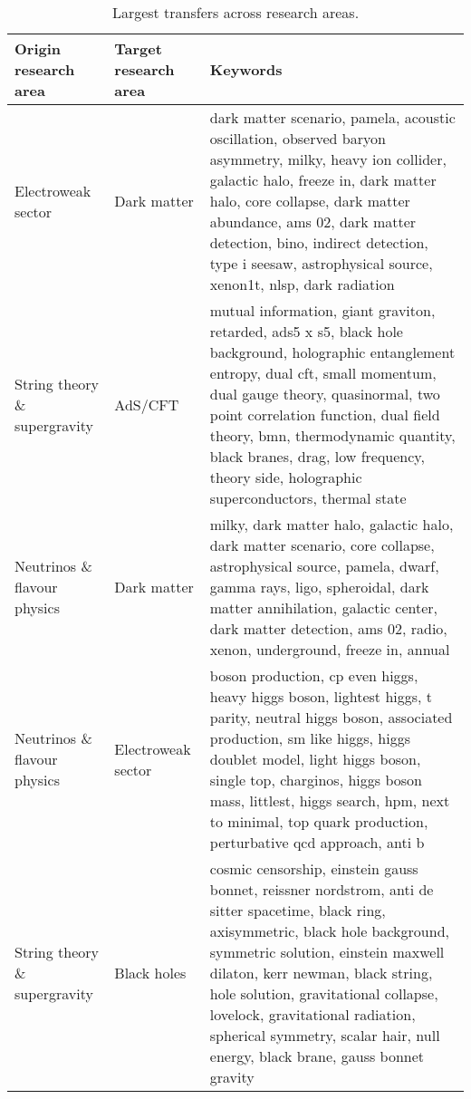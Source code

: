 \begin{table}
\centering
\caption{Largest transfers across research areas.}
\label{table:largest_transfers}
\begin{tabular}{b{}|b{}|b{}}
\toprule
         Origin research area & Target research area &                                                                                                                                                                                                                                                                                                                                                                    Keywords \\ \hline
\midrule
           Electroweak sector &          Dark matter &                                                     dark matter scenario, pamela, acoustic oscillation, observed baryon asymmetry, milky, heavy ion collider, galactic halo, freeze in, dark matter halo, core collapse, dark matter abundance, ams 02, dark matter detection, bino, indirect detection, type i seesaw, astrophysical source, xenon1t, nlsp, dark radiation \\ \hline
String theory \& supergravity &              AdS/CFT &                      mutual information, giant graviton, retarded, ads5 x s5, black hole background, holographic entanglement entropy, dual cft, small momentum, dual gauge theory, quasinormal, two point correlation function, dual field theory, bmn, thermodynamic quantity, black branes, drag, low frequency, theory side, holographic superconductors, thermal state \\ \hline
 Neutrinos \& flavour physics &          Dark matter &                                                                                                      milky, dark matter halo, galactic halo, dark matter scenario, core collapse, astrophysical source, pamela, dwarf, gamma rays, ligo, spheroidal, dark matter annihilation, galactic center, dark matter detection, ams 02, radio, xenon, underground, freeze in, annual \\ \hline
 Neutrinos \& flavour physics &   Electroweak sector &                                             boson production, cp even higgs, heavy higgs boson, lightest higgs, t parity, neutral higgs boson, associated production, sm like higgs, higgs doublet model, light higgs boson, single top, charginos, higgs boson mass, littlest, higgs search, hpm, next to minimal, top quark production, perturbative qcd approach, anti b \\ \hline
String theory \& supergravity &          Black holes & cosmic censorship, einstein gauss bonnet, reissner nordstrom, anti de sitter spacetime, black ring, axisymmetric, black hole background, symmetric solution, einstein maxwell dilaton, kerr newman, black string, hole solution, gravitational collapse, lovelock, gravitational radiation, spherical symmetry, scalar hair, null energy, black brane, gauss bonnet gravity \\ \hline
\bottomrule
\end{tabular}
\end{table}
